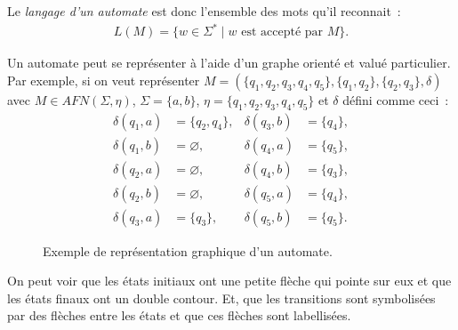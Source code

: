 \begin{definition}
  Le \textit{langage d'un automate} est donc l'ensemble des mots qu'il
  reconnait~:
  \begin{align*}
    L(M) = \{w \in \Sigma^* \mid w \text{ est accepté par } M\}.
  \end{align*}
\end{definition}

\begin{example}
  Un automate peut se représenter à l'aide d'un graphe orienté et valué
  particulier. Par exemple, si on veut représenter \(M = (\{q_1, q_2, q_3,
  q_4, q_5\}, \{q_1, q_2\},\{q_2, q_3\}, \delta)\) avec \(M \in AFN(\Sigma,
  \eta)\), \(\Sigma = \{a, b\}\), \(\eta = \{q_1, q_2, q_3, q_4, q_5\}\) et
  \(\delta\) défini comme ceci~:
  \begin{align*}
    \delta(q_1, a) &= \{q_2, q_4\}, & \delta(q_3, b) & = \{q_4\}, \\
    \delta(q_1, b) &= \varnothing,  & \delta(q_4, a) & = \{q_5\}, \\
    \delta(q_2, a) &= \varnothing,  & \delta(q_4, b) & = \{q_3\}, \\
    \delta(q_2, b) &= \varnothing,  & \delta(q_5, a) & = \{q_4\}, \\
    \delta(q_3, a) &= \{q_3\},      & \delta(q_5, b) & = \{q_5\}.
  \end{align*}
  \begin{figure}[H]
    \centering
    \captionsetup{type=figure,justification=centering}
    \caption{Exemple de représentation graphique d'un automate.}
  \end{figure}

  On peut voir que les états initiaux ont une petite flèche qui pointe sur eux
  et que les états finaux ont un double contour. Et, que les transitions sont
  symbolisées par des flèches entre les états et que ces flèches sont 
  labellisées.
\end{example}

